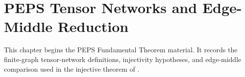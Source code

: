 
\chapter{PEPS Tensor Networks and Edge-Middle Reduction}%
\label{ch:peps_foundations_edge_middle}

This chapter begins the PEPS Fundamental Theorem material. It records the
finite-graph tensor-network definitions, injectivity hypotheses, and edge-middle
comparison used in the injective theorem of
\cite[Theorem~2]{Molnar2018NormalPEPS}.



